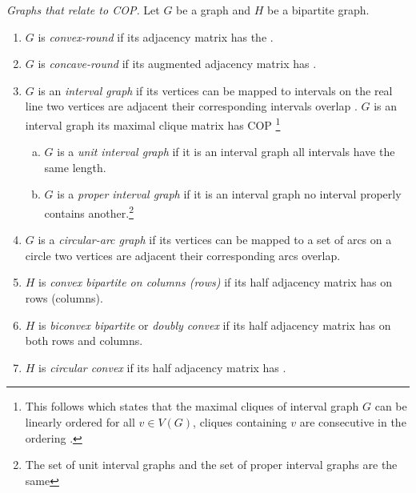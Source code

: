 \begin{definition}{\emph{Graphs that relate to
      COP.\cite[Def.~2.5]{d08phd}}} %
  \label{def:graphwithcop} %
  Let $G$ be a graph and $H$ be a bipartite graph.
  \begin{enumerate}
  \item $G$ is \emph{convex-round} if its adjacency matrix has the
    \CROP.
  \item \label{def::concave-round} $G$ is \emph{concave-round} if its
    augmented adjacency matrix has \CROP. 
  \item $G$ is an \emph{interval graph} if its vertices can be mapped
    to intervals on the real line \stt two vertices are adjacent \iff
    their corresponding intervals overlap .
    $G$ is an interval graph \iff its maximal clique matrix has COP
    \cite{fg65}\footnote{This follows \cite{gh64} which states that the
      maximal cliques of interval graph $G$ can be linearly ordered
      \stt for all $v \in V(G)$, cliques containing $v$ are
      consecutive in the ordering \cite[Th. 8.1]{mcg04}.}
    \begin{enumerate}[a.]
    \item $G$ is a \emph{unit interval graph} if it is an interval
      graph \stt all intervals have the same length.\footnotemark[2]
    \item $G$ is a \emph{proper interval graph} if it is an interval
      graph \stt no interval properly contains another.\footnote{The
        set of unit interval graphs and the set of proper interval
        graphs are the same} 
    \end{enumerate}
 \item $G$ is a \emph{circular-arc graph} if its vertices can be
    mapped to a set of arcs on a circle \stt two vertices are adjacent
    \iff their corresponding arcs overlap.
  \item $H$ is \emph{convex bipartite on columns (rows)} if its half
    adjacency matrix has \COP on rows (columns).%
    \label{def::convexbi}
  \item $H$ is \emph{biconvex bipartite} or \emph{doubly
      convex}\cite{yc95} if its half adjacency matrix has \COP on both
    rows and columns.
  \item $H$ is \emph{circular convex} if its half adjacency matrix has
    \CROP.
  \end{enumerate}
\end{definition}

